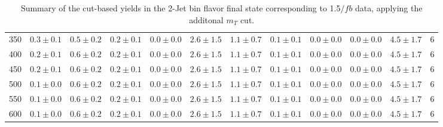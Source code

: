 \begin{table}
{\begin{center}
\begin{tabular}{l c c c c c c c c c c c }
350 & $0.3\pm0.1$ & $0.5\pm0.2$ & $0.2\pm0.1$ & $0.0\pm0.0$ & $2.6\pm1.5$ & $1.1\pm0.7$ & $0.1\pm0.1$ & $0.0\pm0.0$ & $0.0\pm0.0$ & $4.5\pm1.7$ & 6 \\
400 & $0.2\pm0.1$ & $0.6\pm0.2$ & $0.2\pm0.1$ & $0.0\pm0.0$ & $2.6\pm1.5$ & $1.1\pm0.7$ & $0.1\pm0.1$ & $0.0\pm0.0$ & $0.0\pm0.0$ & $4.5\pm1.7$ & 6 \\
450 & $0.2\pm0.1$ & $0.6\pm0.2$ & $0.2\pm0.1$ & $0.0\pm0.0$ & $2.6\pm1.5$ & $1.1\pm0.7$ & $0.1\pm0.1$ & $0.0\pm0.0$ & $0.0\pm0.0$ & $4.5\pm1.7$ & 6 \\
500 & $0.1\pm0.0$ & $0.6\pm0.2$ & $0.2\pm0.1$ & $0.0\pm0.0$ & $2.6\pm1.5$ & $1.1\pm0.7$ & $0.1\pm0.1$ & $0.0\pm0.0$ & $0.0\pm0.0$ & $4.5\pm1.7$ & 6 \\
550 & $0.1\pm0.0$ & $0.6\pm0.2$ & $0.2\pm0.1$ & $0.0\pm0.0$ & $2.6\pm1.5$ & $1.1\pm0.7$ & $0.1\pm0.1$ & $0.0\pm0.0$ & $0.0\pm0.0$ & $4.5\pm1.7$ & 6 \\
600 & $0.1\pm0.0$ & $0.6\pm0.2$ & $0.2\pm0.1$ & $0.0\pm0.0$ & $2.6\pm1.5$ & $1.1\pm0.7$ & $0.1\pm0.1$ & $0.0\pm0.0$ & $0.0\pm0.0$ & $4.5\pm1.7$ & 6 \\
\hline
\end{tabular}
\end{center}
}
\caption{Summary of the cut-based yields in the 2-Jet bin flavor final state corresponding to 1.5$/fb$ data, applying the additonal $m_T$ cut.}
\end{table}
